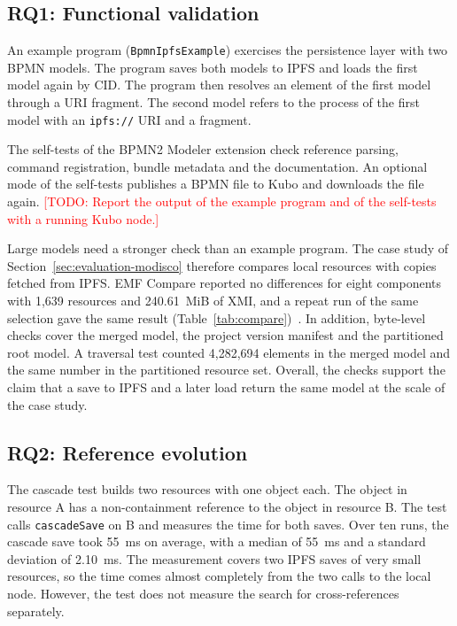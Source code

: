 \documentclass[iicol,pdflatex,sn-mathphys-num]{sn-jnl}
\theoremstyle{thmstylethree}%
\newcommand{\todo}[1]{\textcolor{red}{[TODO: #1]}}
\begin{document}
\subsection{RQ1: Functional validation}\label{sec:evaluation-rq1}

An example program (\texttt{BpmnIpfsExample}) exercises the persistence layer with two BPMN models. The program saves both models to IPFS and loads the first model again by CID. The program then resolves an element of the first model through a URI fragment. The second model refers to the process of the first model with an \texttt{ipfs://} URI and a fragment.

The self-tests of the BPMN2 Modeler extension check reference parsing, command registration, bundle metadata and the documentation. An optional mode of the self-tests publishes a BPMN file to Kubo and downloads the file again. \todo{Report the output of the example program and of the self-tests with a running Kubo node.}

Large models need a stronger check than an example program. The case study of Section~\ref{sec:evaluation-modisco} therefore compares local resources with copies fetched from IPFS. EMF Compare reported no differences for eight components with 1,639 resources and 240.61~MiB of XMI, and a repeat run of the same selection gave the same result (Table~\ref{tab:compare})~\cite{emfcompare}. In addition, byte-level checks cover the merged model, the project version manifest and the partitioned root model. A traversal test counted 4,282,694 elements in the merged model and the same number in the partitioned resource set. Overall, the checks support the claim that a save to IPFS and a later load return the same model at the scale of the case study.

\subsection{RQ2: Reference evolution}\label{sec:evaluation-rq2}

The cascade test builds two resources with one object each. The object in resource A has a non-containment reference to the object in resource B. The test calls \texttt{cascadeSave} on B and measures the time for both saves. Over ten runs, the cascade save took 55~ms on average, with a median of 55~ms and a standard deviation of 2.10~ms. The measurement covers two IPFS saves of very small resources, so the time comes almost completely from the two calls to the local node. However, the test does not measure the search for cross-references separately.
\end{document}
